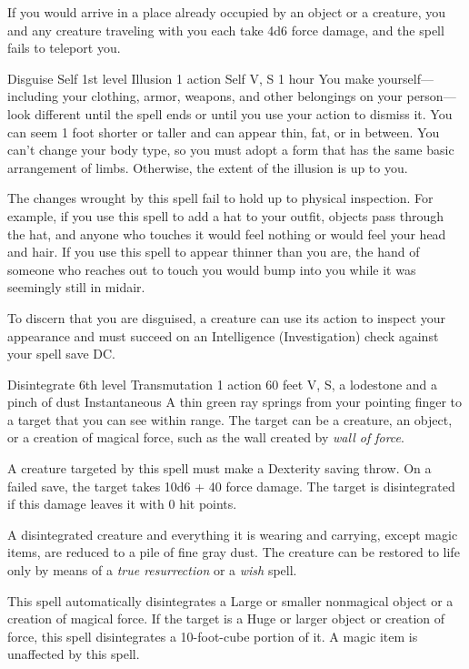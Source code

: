 \documentclass[10pt,a4paper,twoside,bg=print,twocolumn,openany,nodeprecatedcode]{dndbook}
\begin{document}
If you would arrive in a place already occupied by an object or a creature, you and any creature traveling with you each take 4d6 force damage, and the spell fails to teleport you.



\DndSpellHeader%
{Disguise Self}
{1st level Illusion}
{1 action}
{Self}
{V, S}
{1 hour}
You make yourself—including your clothing, armor, weapons, and other belongings on your person—look different until the spell ends or until you use your action to dismiss it. You can seem 1 foot shorter or taller and can appear thin, fat, or in between. You can't change your body type, so you must adopt a form that has the same basic arrangement of limbs. Otherwise, the extent of the illusion is up to you.

The changes wrought by this spell fail to hold up to physical inspection. For example, if you use this spell to add a hat to your outfit, objects pass through the hat, and anyone who touches it would feel nothing or would feel your head and hair. If you use this spell to appear thinner than you are, the hand of someone who reaches out to touch you would bump into you while it was seemingly still in midair.

To discern that you are disguised, a creature can use its action to inspect your appearance and must succeed on an Intelligence (Investigation) check against your spell save DC.



\DndSpellHeader%
{Disintegrate}
{6th level Transmutation}
{1 action}
{60 feet}
{V, S, a lodestone and a pinch of dust}
{Instantaneous}
A thin green ray springs from your pointing finger to a target that you can see within range. The target can be a creature, an object, or a creation of magical force, such as the wall created by \textit{wall of force}.

A creature targeted by this spell must make a Dexterity saving throw. On a failed save, the target takes 10d6 + 40 force damage. The target is disintegrated if this damage leaves it with 0 hit points.

A disintegrated creature and everything it is wearing and carrying, except magic items, are reduced to a pile of fine gray dust. The creature can be restored to life only by means of a \textit{true resurrection} or a \textit{wish} spell.

This spell automatically disintegrates a Large or smaller nonmagical object or a creation of magical force. If the target is a Huge or larger object or creation of force, this spell disintegrates a 10-foot-cube portion of it. A magic item is unaffected by this spell.
\end{document}
